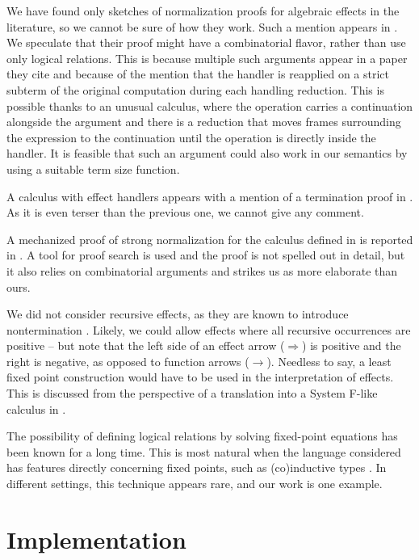 \documentclass[a4paper, 11pt,titlepage, openright, twoside]{report}
\newcommand{\+}{\enspace}
\begin{document}
We have found only sketches of normalization proofs for algebraic effects in the literature,
so we cannot be sure of how they work.
Such a mention appears in \cite{hia}.
We speculate that their proof might have
a combinatorial flavor, rather than use only logical relations.
This is because multiple such arguments appear in a paper they cite \cite{exrw} and
because of the mention that the handler is reapplied
on a strict subterm of the original computation during each handling reduction.
This is possible thanks to an unusual calculus,
where the operation carries a continuation alongside the argument
and there is a reduction that moves frames surrounding the expression to the continuation until
the operation is directly inside the handler.
It is feasible that such an argument could also work in our semantics by using
a suitable term size function.

A calculus with effect handlers appears with a mention of a termination proof in \cite{expressive}.
As it is even terser than the previous one, we cannot give any comment.

A mechanized proof of strong normalization for the calculus defined in \cite{expressive}
is reported in \cite{sol}.
A tool for proof search is used and the proof is not spelled out in detail,
but it also relies on combinatorial arguments and strikes us as more elaborate than ours.

We did not consider recursive effects, as they are known to introduce nontermination \cite{hwc}.
Likely, we could allow effects where all recursive occurrences are positive
– but note that
the left side of an effect arrow ($\Rightarrow$) is positive and the right is negative,
as opposed to function arrows ($→$).
Needless to say, a least fixed point construction would have to be used in the interpretation of effects.
This is discussed from the perspective of a translation into a System F-like calculus in
\cite{xie2020effect}.

The possibility of defining logical relations by solving fixed-point equations
has been known for a long time.
This is most natural when the language considered has features directly
concerning fixed points, such as (co)inductive types \cite{altenkirch, operfl}.
In different settings, this technique appears rare, and our work is one example.


\chapter{Implementation}
\end{document}
